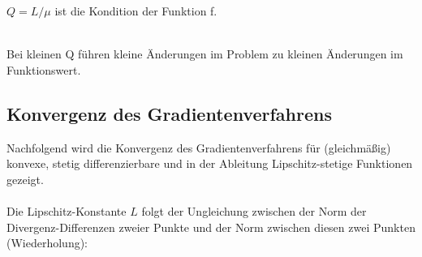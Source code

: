 \begin{Definition}
$Q = L/\mu$ ist die Kondition der Funktion f.
\end{Definition}\mbox{}\\Bei kleinen Q führen kleine Änderungen im Problem zu kleinen Änderungen im Funktionswert.

	
\subsection{Konvergenz des Gradientenverfahrens}

Nachfolgend wird die Konvergenz des Gradientenverfahrens für (gleichmäßig) konvexe, stetig differenzierbare und in der Ableitung Lipschitz-stetige Funktionen gezeigt.\\\\
Die Lipschitz-Konstante $L$ folgt der Ungleichung zwischen der Norm der Divergenz-Differenzen zweier Punkte und der Norm zwischen diesen zwei Punkten (Wiederholung):

